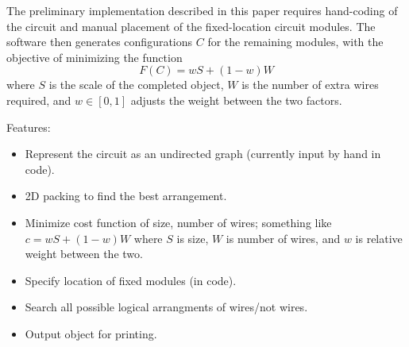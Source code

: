 \documentclass{chi-ext}
\begin{document}
	The preliminary implementation described in this paper requires
	hand-coding of the circuit and manual placement of the
	fixed-location circuit modules. The software then generates
	configurations $C$ for the remaining modules, with the objective of
	minimizing the function
	\[
		F(C) = wS + (1-w)W
	\]
	where $S$ is the scale of the completed object, $W$ is the number of
	extra wires required, and $w \in [0,1]$ adjusts the weight between
	the two factors.
	

	Features:
	\begin{itemize}
		\item Represent the circuit as an undirected graph (currently
			input by hand in code).
		\item 2D packing to find the best arrangement.
		\item Minimize cost function of size, number of wires; something
			like $c = wS + (1-w)W$ where $S$ is size, $W$ is number of
			wires, and $w$ is relative weight between the two.
		\item Specify location of fixed modules (in code).
		\item Search all possible logical arrangments of wires/not wires.
		\item Output object for printing.
	\end{itemize}




\balance


\end{document}
